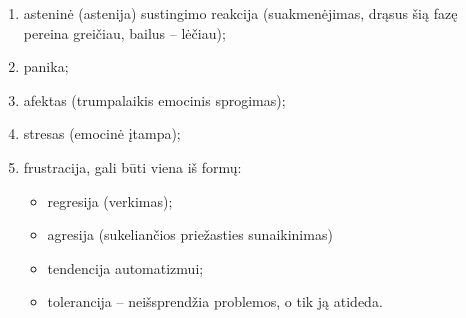 \begin{enumerate}
  \item asteninė (\gls{astenija}) sustingimo reakcija (suakmenėjimas, 
    drąsus šią fazę pereina greičiau, bailus – lėčiau);
  \item panika;
  \item afektas (trumpalaikis emocinis sprogimas);
  \item stresas (emocinė įtampa);
  \item \gls{frustracija}, gali būti viena iš formų:
    \begin{itemize}
      \item \gls{regresija} (verkimas);
      \item agresija (sukeliančios priežasties sunaikinimas)
      \item tendencija automatizmui;
      \item tolerancija – neišsprendžia problemos, o tik ją atideda.
    \end{itemize}
\end{enumerate}
